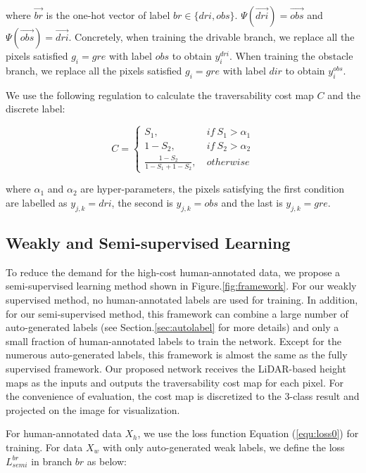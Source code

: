 \documentclass[letterpaper, 10 pt, conference]{ieeeconf}  %
\begin{document}
where $\vec{br}$ is the one-hot vector of label $br\in\{dri, obs\}$. $\Psi(\vec{dri})=\vec{obs}$ and $\Psi(\vec{obs})=\vec{dri}$. Concretely, when training the drivable branch, we replace all the pixels satisfied $g_i=gre$ with label $obs$ to obtain $y_i^{dri}$. When training the obstacle branch, we replace all the pixels satisfied $g_i=gre$ with label $dir$ to obtain $y_i^{obs}$.

We use the following regulation to calculate the traversability cost map $C$ and the discrete label:

\begin{equation}
C= 
\left\{
\begin{array}{ccc}
S_1, &\  if \ S_1>\alpha_1 \\ 
1-S_2, &\ if \ S_2>\alpha_2 \\
\frac{1-S_2}{1-S_1 + 1-S_2}, &\ otherwise
\end{array}
\right.
\end{equation}

where $\alpha_1$ and $\alpha_2$ are hyper-parameters, the pixels satisfying the first condition are labelled as $y_{j,k}=dri$, the second is $y_{j,k}=obs$ and the last is $y_{j,k}=gre$.

\subsection{Weakly and Semi-supervised Learning}

To reduce the demand for the high-cost human-annotated data, we propose a semi-supervised learning method shown in Figure.\ref{fig:framework}. For our weakly supervised method, no human-annotated labels are used for training. In addition, for our semi-supervised method, this framework can combine a large number of auto-generated labels (see Section.\ref{sec:autolabel} for more details) and only a small fraction of human-annotated labels to train the network. Except for the numerous auto-generated labels, this framework is almost the same as the fully supervised framework. Our proposed network receives the LiDAR-based height maps as the inputs and outputs the traversability cost map for each pixel. For the convenience of evaluation, the cost map is discretized to the 3-class result and projected on the image for visualization.

For human-annotated data $X_h$, we use the loss function Equation (\ref{equ:loss0}) for training. For data $X_w$ with only auto-generated weak labels, we define the loss  $L_{semi}^{br}$ in branch $br$ as below:
\end{document}
